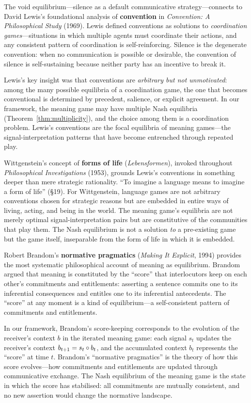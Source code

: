 \begin{interpretation}
\label{interp:ch14:lewis_convention}
The void equilibrium---silence as a default communicative strategy---connects
to David Lewis's foundational analysis of \textbf{convention} in
\emph{Convention: A Philosophical Study} (1969).  Lewis defined conventions
as solutions to \emph{coordination games}---situations in which multiple
agents must coordinate their actions, and any consistent pattern of
coordination is self-reinforcing.  Silence is the degenerate convention: when
no communication is possible or desirable, the convention of silence is
self-sustaining because neither party has an incentive to break it.

Lewis's key insight was that conventions are \emph{arbitrary but not
unmotivated}: among the many possible equilibria of a coordination game, the
one that becomes conventional is determined by precedent, salience, or
explicit agreement.  In our framework, the meaning game may have multiple
Nash equilibria (Theorem~\ref{thm:multiplicity}), and the choice among them
is a coordination problem.  Lewis's conventions are the focal equilibria of
meaning games---the signal-interpretation patterns that have become
entrenched through repeated play.

Wittgenstein's concept of \textbf{forms of life} (\emph{Lebensformen}),
invoked throughout \emph{Philosophical Investigations} (1953), grounds
Lewis's conventions in something deeper than mere strategic rationality.
``To imagine a language means to imagine a form of life'' (\S19).  For
Wittgenstein, language games are not arbitrary conventions chosen for
strategic reasons but are embedded in entire ways of living, acting, and
being in the world.  The meaning game's equilibria are not merely optimal
signal-interpretation pairs but are constitutive of the communities that
play them.  The Nash equilibrium is not a solution \emph{to} a pre-existing
game but the game itself, inseparable from the form of life in which it is
embedded.

Robert Brandom's \textbf{normative pragmatics} (\emph{Making It Explicit},
1994) provides the most systematic philosophical account of meaning as
equilibrium.  Brandom argued that meaning is constituted by the ``score''
that interlocutors keep on each other's commitments and entitlements:
asserting a sentence commits one to its inferential consequences and
entitles one to its inferential antecedents.  The ``score'' at any moment is
a kind of equilibrium---a self-consistent pattern of commitments and
entitlements.

In our framework, Brandom's score-keeping corresponds to the evolution of
the receiver's context $b$ in the iterated meaning game: each signal $s_t$
updates the receiver's context $b_{t+1} = s_t \circ b_t$, and the
accumulated context $b_t$ represents the ``score'' at time $t$.  Brandom's
``normative pragmatics'' is the theory of how this score evolves---how
commitments and entitlements are updated through communicative exchange.  The
Nash equilibrium of the meaning game is the state in which the score has
stabilised: all commitments are mutually consistent, and no new assertion
would change the normative landscape.
\end{interpretation}
